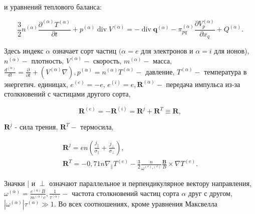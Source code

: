 \documentclass[10pt]{article}
\begin{document}
и уравнений теплового баланса:



\[

\frac{3}{2} n^{(\alpha)} \frac{\partial^{(\alpha)} T^{(\alpha)}}{\partial t}+p^{(\alpha)} \operatorname{div} V^{(\alpha)}=-\operatorname{div} \boldsymbol{q}^{(\alpha)}-\pi_{p q}^{(\alpha)} \frac{\partial V_{p}^{(\alpha)}}{\partial x_{q}}+Q^{(\alpha)} .

\]



Здесь индекс $\alpha$ означает сорт частиц $(\alpha=e$ для электронов и $\alpha=i$ для ионов), $n^{(\alpha)}-$ плотность, $V^{(\alpha)}-$ скорость, $m^{(\alpha)}-$ масса, $\frac{d^{(\alpha)}}{d t}=\frac{\partial}{\partial t}+\left(V^{(\alpha)} \nabla\right), p^{(\alpha)}=n^{(\alpha)} T^{(\alpha)}-$ давление, $T^{(\alpha)}-$ температура в энергетич. единицах, $e^{(e)}=-e$, $e^{(i)}=e, \boldsymbol{R}^{(\alpha)}-$ передача импульса из-за столкновений с частицами другого сорта,



\[

\boldsymbol{R}^{(e)}=-\boldsymbol{R}^{(i)}=\boldsymbol{R}^{j}+\boldsymbol{R}^{T} \equiv \boldsymbol{R},

\]



$\boldsymbol{R}^{j}$ - сила трения, $\boldsymbol{R}^{T}-$ термосила,



\[

\begin{gathered}

\boldsymbol{R}^{j}=e n\left(\frac{j_{\|}}{\sigma_{\|}}+\frac{j_{\perp}}{\sigma_{\perp}}\right), \\

\boldsymbol{R}^{T}=-0,71 n \nabla_{\|} T^{(e)}-\frac{3}{2} \frac{n}{\omega^{(e)_{\tau}(e)}} \frac{\boldsymbol{B}}{B} \times \nabla T^{(e)} .

\end{gathered}

\]



Значки | и $\perp$ означают параллельное и перпендикулярное вектору направления, $\omega^{(\alpha)}=\frac{e^{(\alpha)} B}{m^{(\alpha)} c}, \frac{1}{\tau^{(\alpha)}}-$ частота столкновений частиц сорта $\alpha$ друг с другом, $\left|\omega^{(\alpha)}\right| \tau^{(\alpha)} \gg 1$. Во всех соотношениях, кроме уравнения Максвелла
\end{document}
